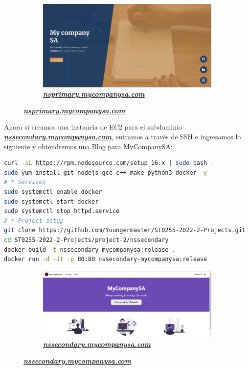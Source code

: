 \begin{figure}[H]
    \centering
    \begin{subfigure}[b]{0.8\textwidth}
        \centering
        \includegraphics[width=\textwidth]{Figures/0. General/nsprimary.mycompanysa.com.png}
        \caption{\textbf{\textit{\url{nsprimary.mycompanysa.com}}}}
        \label{fig: nsprimary.mycompanysa.com config}
    \end{subfigure}
\end{figure}


Ahora si creamos una instancia de EC2 para el subdominio
\textbf{\textit{\url{nssecondary.mycompanysa.com}}}, entramos a través de SSH e
ingresamos lo siguiente y obtendremos una Blog para MyCompanySA:

\begin{lstlisting}[language=Bash]
curl -sL https://rpm.nodesource.com/setup_16.x | sudo bash -
sudo yum install git nodejs gcc-c++ make python3 docker -y
# * Services
sudo systemctl enable docker
sudo systemctl start docker
sudo systemctl stop httpd.service
# * Project setup
git clone https://github.com/Youngermaster/ST0255-2022-2-Projects.git
cd ST0255-2022-2-Projects/project-2/nssecondary
docker build -t nssecondary-mycompanysa:release .
docker run -d -it -p 80:80 nssecondary-mycompanysa:release
\end{lstlisting}

\begin{figure}[H]
    \centering
    \begin{subfigure}[b]{0.8\textwidth}
        \centering
        \includegraphics[width=\textwidth]{Figures/0. General/nssecondary.mycompanysa.com.png}
        \caption{\textbf{\textit{\url{nssecondary.mycompanysa.com}}}}
        \label{fig: nssecondary.mycompanysa.com config}
    \end{subfigure}
\end{figure}

